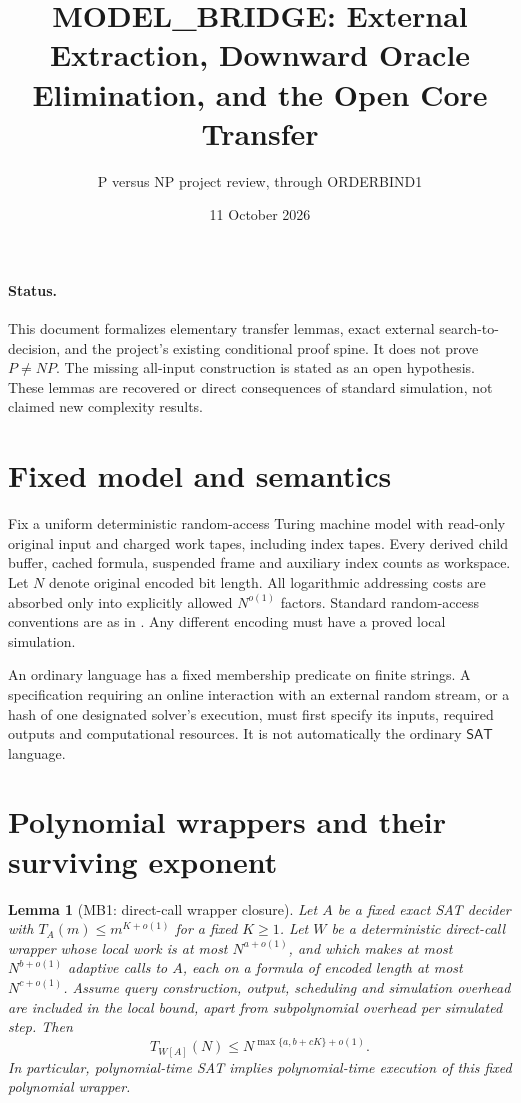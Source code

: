 \documentclass[11pt]{article}
\title{MODEL\_BRIDGE: External Extraction, Downward Oracle Elimination, and the Open Core Transfer}
\author{P versus NP project review, through ORDERBIND1}
\date{11 October 2026}
\newtheorem{lemma}{Lemma}
\newcommand{\SAT}{\mathsf{SAT}}
\begin{document}
\maketitle

\paragraph{Status.}
This document formalizes elementary transfer lemmas, exact external
search-to-decision, and the project's existing conditional proof spine.
It does not prove $P\ne NP$.
The missing all-input construction is stated as an open hypothesis.
These lemmas are recovered or direct consequences of standard simulation,
not claimed new complexity results.

\section{Fixed model and semantics}

Fix a uniform deterministic random-access Turing machine model with
read-only original input and charged work tapes, including index tapes.
Every derived child buffer, cached formula, suspended frame and auxiliary
index counts as workspace. Let $N$ denote original encoded bit length.
All logarithmic addressing costs are absorbed only into explicitly allowed
$N^{o(1)}$ factors. Standard random-access conventions are as in
\cite{flmv}. Any different encoding must have a proved local simulation.

An ordinary language has a fixed membership predicate on finite strings.
A specification requiring an online interaction with an external random
stream, or a hash of one designated solver's execution, must first specify
its inputs, required outputs and computational resources. It is not
automatically the ordinary $\SAT$ language.

\section{Polynomial wrappers and their surviving exponent}

\begin{lemma}[MB1: direct-call wrapper closure]
Let $A$ be a fixed exact SAT decider with
$T_A(m)\le m^{K+o(1)}$ for a fixed $K\ge1$.
Let $W$ be a deterministic direct-call wrapper whose local work is at most
$N^{a+o(1)}$, and which makes at most $N^{b+o(1)}$ adaptive calls to $A$,
each on a formula of encoded length at most $N^{c+o(1)}$.
Assume query construction, output, scheduling and simulation overhead are
included in the local bound, apart from subpolynomial overhead per simulated
step. Then
\[
T_{W[A]}(N)\le
N^{\max\{a,b+cK\}+o(1)}.
\]
In particular, polynomial-time SAT implies polynomial-time execution of
this fixed polynomial wrapper.
\end{lemma}
\end{document}
